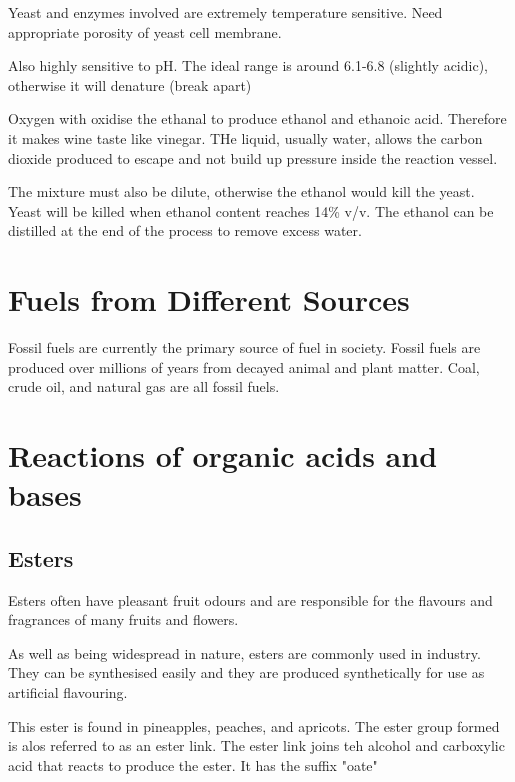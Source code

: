 		Yeast and enzymes involved are extremely temperature sensitive. Need appropriate porosity of yeast cell membrane.

		Also highly sensitive to pH. The ideal range is around 6.1-6.8 (slightly acidic), otherwise it will denature (break apart)

		Oxygen with oxidise the ethanal to produce ethanol and ethanoic acid. Therefore it makes wine taste like vinegar. THe liquid, usually water, allows the carbon dioxide produced to escape and not build up pressure inside the reaction vessel.

		The mixture must also be dilute, otherwise the ethanol would kill the yeast. Yeast will be killed when ethanol content reaches 14\% v/v. The ethanol can be distilled at the end of the process to remove excess water.

\section{Fuels from Different Sources}

	Fossil fuels are currently the primary source of fuel in society. Fossil fuels are produced over millions of years from decayed animal and plant matter. Coal, crude oil, and natural gas are all fossil fuels.

\section{Reactions of organic acids and bases}

	\subsection{Esters}

		Esters often have pleasant fruit odours and are responsible for the flavours and fragrances of many fruits and flowers.

		As well as being widespread in nature, esters are commonly used in industry. They can be synthesised easily and they are produced synthetically for use as artificial flavouring.

		\begin{center}
		\end{center}

		This ester is found in pineapples, peaches, and apricots. The ester group formed is alos referred to as an ester link. The ester link joins teh alcohol and carboxylic acid that reacts to produce the ester. It has the suffix "oate"


